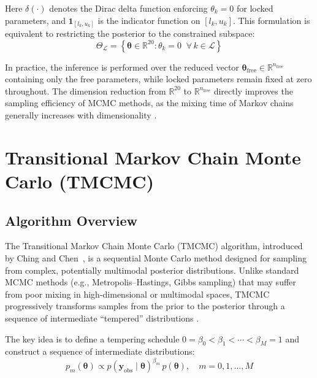 \documentclass[11pt,a4paper]{article}
\begin{document}
\noindent Here $\delta(\cdot)$ denotes the Dirac delta function enforcing $\theta_k = 0$ for locked parameters, and $\mathbf{1}_{[l_k, u_k]}$ is the indicator function on $[l_k, u_k]$. This formulation is equivalent to restricting the posterior to the constrained subspace:
\begin{equation}
\Theta_{\mathcal{L}} = \left\{\boldsymbol{\theta} \in \mathbb{R}^{20} : \theta_k = 0 \;\; \forall\, k \in \mathcal{L}\right\}
\end{equation}

\noindent In practice, the inference is performed over the reduced vector $\boldsymbol{\theta}_{\mathrm{free}} \in \mathbb{R}^{n_{\mathrm{free}}}$ containing only the free parameters, while locked parameters remain fixed at zero throughout. The dimension reduction from $\mathbb{R}^{20}$ to $\mathbb{R}^{n_{\mathrm{free}}}$ directly improves the sampling efficiency of MCMC methods, as the mixing time of Markov chains generally increases with dimensionality \cite{RobertCasella2004MonteCarlo}.

\section{Transitional Markov Chain Monte Carlo (TMCMC)}
\label{sec:tmcmc}

\subsection{Algorithm Overview}

The Transitional Markov Chain Monte Carlo (TMCMC) algorithm, introduced by Ching and Chen~\cite{ChingChen2007TMCMC}, is a sequential Monte Carlo method designed for sampling from complex, potentially multimodal posterior distributions. Unlike standard MCMC methods (e.g., Metropolis--Hastings, Gibbs sampling) that may suffer from poor mixing in high-dimensional or multimodal spaces, TMCMC progressively transforms samples from the prior to the posterior through a sequence of intermediate ``tempered'' distributions \cite{DelMoral2006SMC}.

The key idea is to define a tempering schedule $0 = \beta_0 < \beta_1 < \cdots < \beta_M = 1$ and construct a sequence of intermediate distributions:
\begin{equation}
p_m(\boldsymbol{\theta}) \propto p(\mathbf{y}_{\mathrm{obs}} \mid \boldsymbol{\theta})^{\beta_m}\, p(\boldsymbol{\theta}), \quad m = 0, 1, \ldots, M
\label{eq:tempered}
\end{equation}
\end{document}
